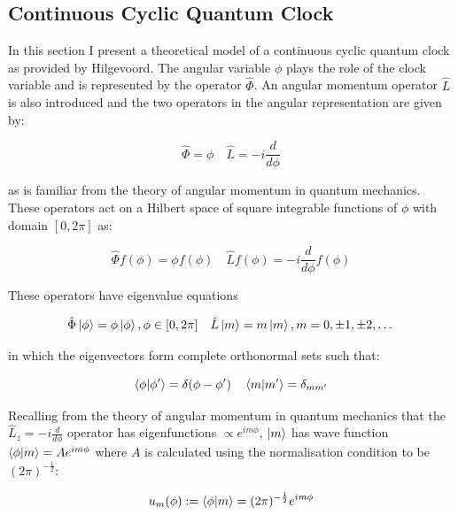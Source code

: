 \documentclass{article}
\begin{document}
\subsection{Continuous Cyclic Quantum Clock}
\label{subsection:ccqc}

In this section I present a theoretical model of a continuous cyclic quantum clock as provided by Hilgevoord. The angular variable $\phi$ plays the role of the clock variable and is represented by the operator $\hat{\Phi}$. An angular momentum operator $\hat{L}$ is also introduced and the two operators in the angular representation are given by:

\begin{equation}
	\hat{\Phi} = \phi \quad \hat{L} = -i \frac{d}{d\phi}
\end{equation}

\noindent as is familiar from the theory of angular momentum in quantum mechanics. These operators act on a Hilbert space of square integrable functions of $\phi$ with domain $[0,2\pi]$ as:

\begin{equation}
	\hat{\Phi} f(\phi) = \phi f(\phi) \quad \hat{L} f(\phi) = -i \frac{d}{d\phi}f(\phi)
\end{equation}

\noindent These operators have eigenvalue equations 

\begin{equation}
	\hat{\Phi}\ket{\phi} = \phi\ket{\phi}, \phi \in [0,2\pi] \quad \hat{L}\ket{m} = m\ket{m}, m = 0, \pm 1, \pm 2,\dots
\end{equation}

\noindent in which the eigenvectors form complete orthonormal sets such that:

\begin{equation}
	\braket{\phi|\phi'} = \delta(\phi-\phi ') \quad \braket{m|m'} = \delta_{mm'}
\end{equation}

\noindent Recalling from the theory of angular momentum in quantum mechanics that the $\hat{L}_z = -i \frac{d}{d\phi}$ operator has eigenfunctions $\propto e^{im\phi}$, $\ket{m}$ has wave function $\braket{\phi|m}= Ae^{im\phi}$ where $A$ is calculated using the normalisation condition to be $(2\pi)^{-\frac{1}{2}}$:

\begin{equation}
	u_m(\phi) := \braket{\phi|m} = (2\pi)^{-\frac{1}{2}}e^{im\phi}
\end{equation}
\end{document}
